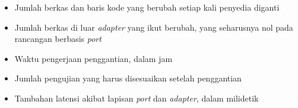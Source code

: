 \documentclass[11pt,a4paper]{article}
\begin{document}
\begin{itemize}[leftmargin=*]
  \item Jumlah berkas dan baris kode yang berubah setiap kali penyedia diganti
  \item Jumlah berkas di luar \textit{adapter} yang ikut berubah, yang seharusnya nol pada rancangan berbasis \textit{port}
  \item Waktu pengerjaan penggantian, dalam jam
  \item Jumlah pengujian yang harus disesuaikan setelah penggantian
  \item Tambahan latensi akibat lapisan \textit{port} dan \textit{adapter}, dalam milidetik
\end{itemize}



\end{document}
